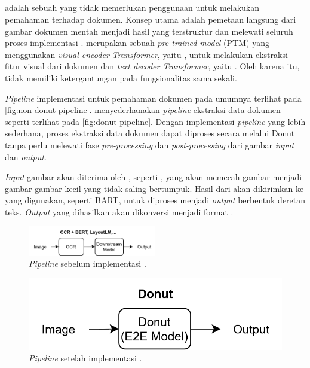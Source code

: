 \subsection{\donutfull}
\label{subsec:donut}

\donutfull{} adalah sebuah \transformer{} yang tidak memerlukan penggunaan \ocr{} untuk melakukan pemahaman terhadap dokumen. Konsep utama \donut{} adalah pemetaan langsung dari gambar dokumen mentah menjadi hasil yang terstruktur dan melewati seluruh proses implementasi \ocr{} \parencite{kim2021donut}. \donut{} merupakan sebuah \emph{pre-trained model} (PTM) yang menggunakan \emph{visual encoder Transformer}, yaitu \swin{}, untuk melakukan ekstraksi fitur visual dari dokumen dan \emph{text decoder Transformer}, yaitu \bartfull. Oleh karena itu, \donut{} tidak memiliki ketergantungan pada fungsionalitas \ocr{} sama sekali.

\textit{Pipeline} implementasi \transformer{} untuk pemahaman dokumen pada umumnya terlihat pada \autoref{fig:non-donut-pipeline}. \donut{} menyederhanakan \emph{pipeline} ekstraksi data dokumen seperti terlihat pada \autoref{fig:donut-pipeline}. Dengan implementasi \textit{pipeline} yang lebih sederhana, proses ekstraksi data dokumen dapat diproses secara \ee{} melalui Donut tanpa perlu melewati fase \textit{pre-processing} dan \textit{post-processing} dari gambar \textit{input} dan \textit{output}.

\textit{Input} gambar akan diterima oleh \encoder, seperti \swin{}, yang akan memecah gambar menjadi gambar-gambar kecil yang tidak saling bertumpuk. Hasil dari \encoder{} akan dikirimkan ke \decoder{} \transformer{} yang digunakan, seperti BART, untuk diproses menjadi \textit{output} berbentuk deretan teks. \textit{Output} yang dihasilkan akan dikonversi menjadi format \jsonfull.

\begin{figure}[htbp]
	\centering
	\includegraphics[width=0.5\textwidth]{images/non-donut-pipeline}
	\caption{\textit{Pipeline} sebelum implementasi \donut{} \parencite{kim2021donut}.}
	\label{fig:non-donut-pipeline}
\end{figure}

\begin{figure}[htbp]
	\centering
	\includegraphics[width=0.5 	\textwidth]{images/donut-pipeline.png}
	\caption{\textit{Pipeline} setelah implementasi \donut{} \parencite{kim2021donut}.}
	\label{fig:donut-pipeline}
\end{figure}